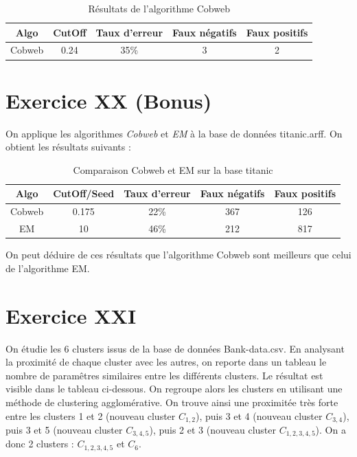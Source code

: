 \documentclass[a4paper, 11pt]{report}
\begin{document}
        \begin{table}[h!]
        \centering
        \begin{tabular}{| c | c | c | c | c |}
        \hline
         Algo & CutOff & Taux d'erreur & Faux négatifs & Faux positifs  \\
         \hline
         Cobweb & 0.24 & 35\% & 3 & 2 \\
         \hline
         
         
        \end{tabular}
        \caption{Résultats de l'algorithme Cobweb}
        \label{tab:exo18}
        \end{table}

        \section{Exercice XX (Bonus)}
        On applique les algorithmes \emph{Cobweb} et \emph{EM} à la base de données titanic.arff. On obtient les résultats suivants :
        \begin{table}[h!]
        \centering
        \begin{tabular}{| c | c | c | c | c |}
        \hline
         Algo & CutOff/Seed & Taux d'erreur & Faux négatifs & Faux positifs  \\
         \hline
         Cobweb & 0.175 & 22\% & 367 & 126 \\
         \hline
         EM & 10 & 46\% & 212 & 817 \\
         \hline
         
        \end{tabular}
        \caption{Comparaison Cobweb et EM sur la base titanic}
        \label{tab:exo20}
        \end{table}
        
        On peut déduire de ces résultats que l'algorithme Cobweb sont meilleurs que celui de l'algorithme EM.
        

	\section{Exercice XXI}
	On étudie les 6 clusters issus de la base de données Bank-data.csv. En analysant la proximité de chaque cluster avec les autres, on reporte dans un tableau le nombre de paramêtres similaires entre les différents clusters. Le résultat est visible dans le tableau ci-dessous. On regroupe alors les clusters en utilisant une méthode de clustering agglomérative. On trouve ainsi une proximitée très forte entre les clusters 1 et 2 (nouveau cluster $C_{1,2}$), puis 3 et 4 (nouveau cluster $C_{3,4}$), puis 3 et 5 (nouveau cluster $C_{3,4,5}$), puis 2 et 3 (nouveau cluster $C_{1,2,3,4,5}$). On a donc 2 clusters : $C_{1,2,3,4,5}$ et $C_6$.
	
\end{document}
